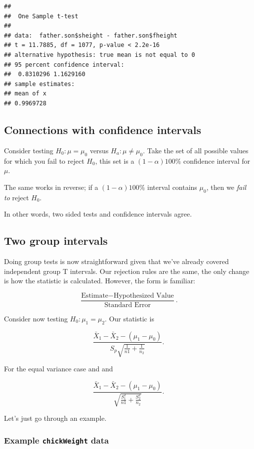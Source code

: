 \documentclass[]{article}
\begin{document}
\begin{verbatim}
## 
##  One Sample t-test
## 
## data:  father.son$sheight - father.son$fheight
## t = 11.7885, df = 1077, p-value < 2.2e-16
## alternative hypothesis: true mean is not equal to 0
## 95 percent confidence interval:
##  0.8310296 1.1629160
## sample estimates:
## mean of x 
## 0.9969728
\end{verbatim}

\subsection{Connections with confidence
intervals}\label{connections-with-confidence-intervals}

Consider testing $H_0: \mu = \mu_0$ versus $H_a: \mu \neq \mu_0$. Take
the set of all possible values for which you fail to reject $H_0$, this
set is a $(1-\alpha)100\%$ confidence interval for $\mu$.

The same works in reverse; if a $(1-\alpha)100\%$ interval contains
$\mu_0$, then we \emph{fail to} reject $H_0$.

In other words, two sided tests and confidence intervals agree.

\subsection{Two group intervals}\label{two-group-intervals}

Doing group tests is now straightforward given that we've already
covered independent group T intervals. Our rejection rules are the same,
the only change is how the statistic is calculated. However, the form is
familiar:

\[
\frac{\mbox{Estimate} - \mbox{Hypothesized Value}}{\mbox{Standard Error}}.
\]

Consider now testing $H_0 : \mu_1 = \mu_2$. Our statistic is

\[
\frac{\bar X_1 - \bar X_2 - (\mu_1 - \mu_0)}{S_p\sqrt{\frac{1}{n1} + \frac{1}{n_2}}}.
\]

For the equal variance case and and

\[
\frac{\bar X_1 - \bar X_2 - (\mu_1 - \mu_0)}{\sqrt{\frac{S_1^2}{n1} + \frac{S_2^2}{n_2}}}.
\]

Let's just go through an example.

\subsubsection{Example \texttt{chickWeight}
data}\label{example-chickweight-data}
\end{document}
